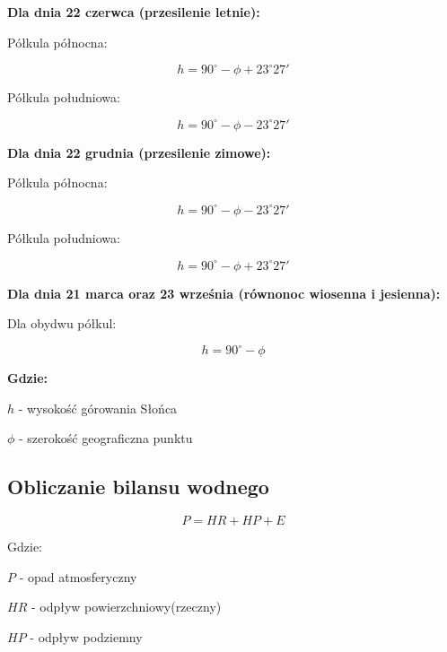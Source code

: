 \documentclass[a4paper,10pt]{article}
\begin{document}
   \textbf{Dla dnia 22 czerwca (przesilenie letnie):}
    
   Półkula północna:
    
   \begin{equation}
    h = 90^{\circ} - \phi + 23^{\circ}{27}' 
   \end{equation}
    
   Półkula południowa:
    
   \begin{equation}
    h = 90^{\circ} - \phi - 23^{\circ}{27}' 
   \end{equation}

   \textbf{Dla dnia 22 grudnia (przesilenie zimowe):}
    
   Półkula północna:
    
   \begin{equation}
    h = 90^{\circ} - \phi - 23^{\circ}{27}' 
   \end{equation}
    
   Półkula południowa:
    
   \begin{equation}
    h = 90^{\circ} - \phi + 23^{\circ}{27}' 
   \end{equation}
     
   \textbf{Dla dnia 21 marca oraz 23 września (równonoc wiosenna i jesienna):}
    
   Dla obydwu półkul:
    
   \begin{equation}
    h = 90^{\circ} - \phi 
   \end{equation}
    
   \textbf{Gdzie:}
    
   $ h $ - wysokość górowania Słońca
    
   $ \phi $ - szerokość geograficzna punktu

  \subsection{Obliczanie bilansu wodnego}
  
  \begin{equation}
   P = HR + HP + E
  \end{equation}

  Gdzie:
  
  $ P $ - opad atmosferyczny
  
  $ HR $ - odpływ powierzchniowy(rzeczny) 
  
  $ HP $ - odpływ podziemny
  
\end{document}
